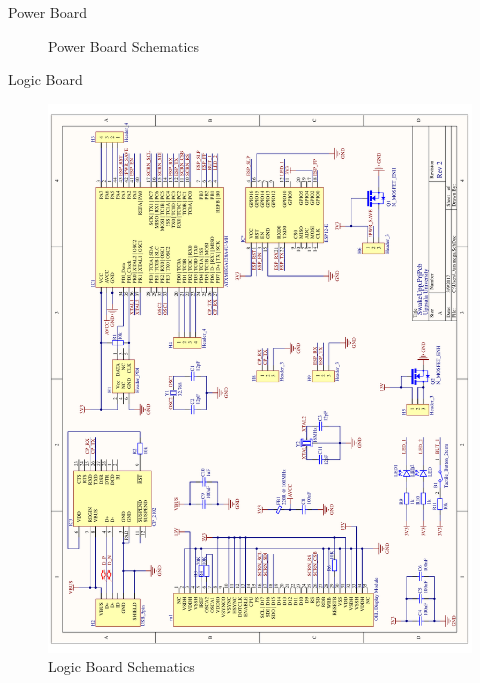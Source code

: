 \documentclass[apectratio=169]{beamer}
\begin{document}
\begin{frame}{Power Board}
\begin{figure}
			\caption{Power Board Schematics}
		\end{figure}	
  	\end{frame}
  	\begin{frame}{Logic Board}	
		\begin{figure}
			\centering
			\includegraphics[height=0.8\textheight]{./fig/logic}
			\caption{Logic Board Schematics}
		\end{figure}
	\end{frame}
\end{document}
